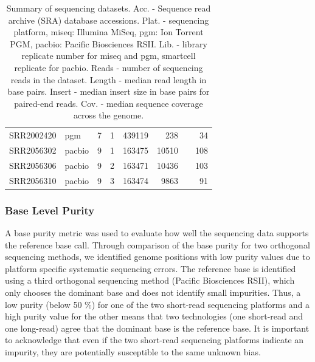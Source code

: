 \documentclass[smallextended]{svjour3}\usepackage[]{graphicx}\usepackage[]{color}
\begin{document}
\begin{table}[ht]
\begin{tabular}{llrrrrrr}
  SRR2002420 & pgm & 7 & 1 & 439119 & 238 &  & 34 \\ 
  SRR2056302 & pacbio & 9 & 1 & 163475 & 10510 &  & 108 \\ 
  SRR2056306 & pacbio & 9 & 2 & 163471 & 10436 &  & 103 \\ 
  SRR2056310 & pacbio & 9 & 3 & 163474 & 9863 &  & 91 \\ 
   \hline
\end{tabular}
\caption{Summary of sequencing datasets. Acc. - Sequence read archive (SRA) database accessions. Plat. - sequencing platform, miseq: Illumina MiSeq, pgm: Ion Torrent PGM, pacbio: Pacific Biosciences RSII. Lib. - library replicate number for miseq and pgm, smartcell replicate for pacbio. Reads - number of sequencing reads in the dataset. Length - median read length in base pairs. 
      Insert - median insert size in base pairs for paired-end reads. 
      Cov. - median sequence coverage across the genome.} 
\label{Table:seqTable}
\end{table}



\subsubsection{Base Level Purity}


A base purity metric was used to evaluate how well the sequencing data supports the reference base call. Through comparison of the base purity for two orthogonal sequencing methods, we identified genome positions with low purity values due to platform specific systematic sequencing errors. 
The reference base is identified using a third orthogonal sequencing method (Pacific Biosciences RSII), which only chooses the dominant base and does not identify small impurities. 
Thus, a low purity (below 50 \%) for one of the two short-read sequencing platforms and a high purity value for the other means that two technologies (one short-read and one long-read) agree that the dominant base is the reference base. 
It is important to acknowledge that even if the two short-read sequencing platforms indicate an impurity, they are potentially susceptible to the same unknown bias.  
\end{document}
